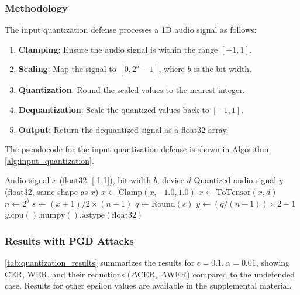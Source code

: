 \documentclass[a4paper,12pt]{article}
\begin{document}
\subsubsection{Methodology}
The input quantization defense processes a 1D audio signal as follows:
\begin{enumerate}
    \item \textbf{Clamping}: Ensure the audio signal is within the range $[-1, 1]$.
    \item \textbf{Scaling}: Map the signal to $[0, 2^b - 1]$, where $b$ is the bit-width.
    \item \textbf{Quantization}: Round the scaled values to the nearest integer.
    \item \textbf{Dequantization}: Scale the quantized values back to $[-1, 1]$.
    \item \textbf{Output}: Return the dequantized signal as a float32 array.
\end{enumerate}

The pseudocode for the input quantization defense is shown in Algorithm \ref{alg:input_quantization}.

\begin{algorithm}
\caption{Input Quantization Defense}
\label{alg:input_quantization}
\begin{algorithmic}[1]
\Require Audio signal $x$ (float32, [-1,1]), bit-width $b$, device $d$
\Ensure Quantized audio signal $y$ (float32, same shape as $x$)
\State $x \gets \text{Clamp}(x, -1.0, 1.0)$ 
\State $x \gets \text{ToTensor}(x, d)$ 
\State $n \gets 2^b$ 
\State $s \gets (x + 1) / 2 \times (n - 1)$ 
\State $q \gets \text{Round}(s)$ 
\State $y \gets (q / (n - 1)) \times 2 - 1$ 
\State \Return $y.\text{cpu}().\text{numpy}().\text{astype}(\text{float32})$
\end{algorithmic}
\end{algorithm}


\subsubsection{Results with PGD Attacks}
\ref{tab:quantization_results} summarizes the results for $\epsilon=0.1, \alpha=0.01$, showing CER, WER, and their reductions ($\Delta$CER, $\Delta$WER) compared to the undefended case. Results for other epsilon values are available in the supplemental material.
\end{document}
